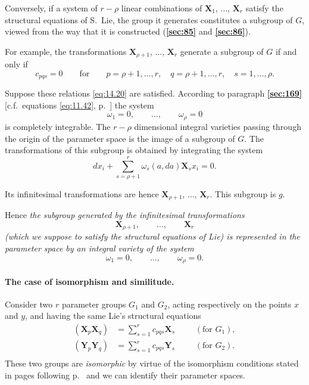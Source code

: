 \documentclass[leqno,11pt]{book}
\numberwithin{equation}{chapter}
\theoremstyle{shape1}
\theoremstyle{shapesmall}
\newcommand{\fsref}[1]{{\rm\textsection\textbf{\ref{sec:#1}}}}
\begin{document}
Conversely, if a system of $r-\rho$ linear combinations of $\mathbf{X}_{1}$, $\dots$, $\mathbf{X}_{r}$ satisfy the structural equations of S.~Lie, the group it generates constitutes a subgroup of $G$, viewed from the way that it is constructed (\fsref{85} and \fsref{86}).

For example, the transformations $\mathbf{X}_{\rho+1}$, $\dots$, $\mathbf{X}_{r}$ generate a subgroup of $G$ if and only if
\begin{equation}
  \label{eq:14.20}
  c_{pqs}=0\qquad \text{for} \qquad p=\rho+1,\dots,r,\quad q=\rho+1 ,\dots,r,\quad s=1,\dots,\rho.
\end{equation}

Suppose these relations \eqref{eq:14.20} are satisfied. According to paragraph \fsref{169} [c.f.~equations \eqref{eq:11.42}, p.~\pageref{eq:11.42}] the system
\[
\omega_{1}=0,\qquad\dots,\qquad\omega_{\rho}=0
\]
is completely integrable. The $r-\rho$ dimensional integral varieties passing through the origin of the parameter space is the image of a subgroup of $G$. The transformations of this subgroup is obtained by integrating the system
\[
dx_{i}+\sum_{s=\rho+1}^{r}\omega_{s}(a,da)\mathbf{X}_{s}x_{i}=0.
\]

Its infinitesimal transformations are hence $\mathbf{X}_{\rho+1}$, $\dots$, $\mathbf{X}_{r}$. This subgroup is $g$.

Hence \emph{the subgroup generated by the infinitesimal transformations}
\[
\mathbf{X}_{\rho+1},\qquad\dots,\qquad\mathbf{X}_{r}
\]
\emph{(which we suppose to satisfy the structural equations of Lie) is represented in the parameter space by an integral variety of the system}
\[
\omega_{1}=0,\qquad\dots,\qquad\omega_{\rho}=0.
\]

\paragraph{The case of isomorphism and similitude.}
\label{sec:213}
Consider two $r$ parameter groups $G_{1}$ and $G_{2}$, acting respectively on the points $x$ and $y$, and having the same Lie's structural equations
\[
\begin{aligned}
  (\mathbf{X}_{p}\mathbf{X}_{q})&=\sum_{s=1}^{r}c_{pqs}\mathbf{X}_{s}&&&(\text{for }G_{1}),\\
  (\mathbf{Y}_{p}\mathbf{Y}_{q})&=\sum_{s=1}^{r}c_{pqs}\mathbf{Y}_{s}&&&(\text{for }G_{2}).\\
\end{aligned}
\]
These two groups are \emph{isomorphic} by virtue of the isomorphism conditions stated in pages following p.~\pageref{sec:164} and we can identify their parameter spaces.
\end{document}
